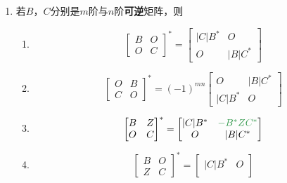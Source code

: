 \documentclass[./linear_algebra.tex]{subfiles}
\begin{document}
\begin{enumerate}
\begin{enumerate}
\[\begin{bmatrix}
                \end{bmatrix}
            \]
        \end{enumerate}
        \item 若$B$，$C$分别是$m$阶与$n$阶\textbf{可逆}矩阵，则
        \begin{enumerate}
            \item
            \[
                \begin{bmatrix}
                    B & O \\
                    O & C
                \end{bmatrix}^{*}
                = \begin{bmatrix}
                      |C|B^{*} & O        \\
                      O        & |B|C^{*}
                \end{bmatrix}
            \]
            \item
            \[
                \begin{bmatrix}
                    O & B \\
                    C & O
                \end{bmatrix}^{*}
                = (-1)^{mn}\begin{bmatrix}
                               O        & |B|C^{*} \\
                               |C|B^{*} & O
                \end{bmatrix}
            \]
            \item
            \[
                \begin{bmatrix}
                    B & Z \\
                    O & C
                \end{bmatrix}^{*}
                = \begin{bmatrix}
                      |C|B^{*} & \color[rgb]{0.2, 0.6, 0.3}{-B^{*}ZC^*} \\
                      O        & |B|C^{*}
                \end{bmatrix}
            \]
            \item
            \[
                \begin{bmatrix}
                    B & O \\
                    Z & C
                \end{bmatrix}^{*}
                = \begin{bmatrix}
                      |C|B^{*}                               & O        \\

\end{bmatrix}\]
\end{enumerate}
\end{enumerate}
\end{document}
